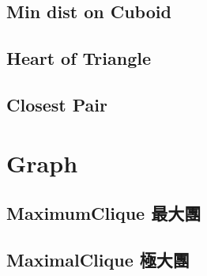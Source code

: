 \documentclass[a4paper,10pt,twocolumn,oneside]{article}
\begin{document}
%

\subsection{Min dist on Cuboid}


\subsection{Heart of Triangle}


\subsection{Closest Pair}


\section{Graph}
% 

%

\subsection{MaximumClique 最大團}
% 


\subsection{MaximalClique 極大團}
% 


%
\end{document}

